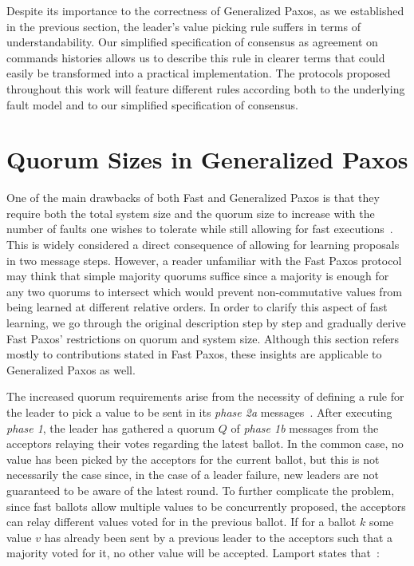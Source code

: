 Despite its importance to the correctness of Generalized Paxos, as we established in the previous section, the leader's value picking rule suffers in terms of understandability. Our simplified specification of consensus as agreement on commands histories allows us to describe this rule in clearer terms that could easily be transformed into a practical implementation. The protocols proposed throughout this work will feature different rules according both to the underlying fault model and to our simplified specification of consensus.

\section{Quorum Sizes in Generalized Paxos} 
One of the main drawbacks of both Fast and Generalized Paxos is that they require both the total system size and the quorum size to increase with the number of faults one wishes to tolerate while still allowing for fast executions~\cite{Lamport2006,Lamport2005}. This is widely considered a direct consequence of allowing for learning proposals in two message steps. However, a reader unfamiliar with the Fast Paxos protocol may think that simple majority quorums suffice since a majority is enough for any two quorums to intersect which would prevent non-commutative values from being learned at different relative orders. In order to clarify this aspect of fast learning, we go through the original description step by step and gradually derive Fast Paxos' restrictions on quorum and system size. Although this section refers mostly to contributions stated in Fast Paxos, these insights are applicable to Generalized Paxos as well.\par
The increased quorum requirements arise from the necessity of defining a rule for the leader to pick a value to be sent in its \textit{phase 2a} messages~\cite{Lamport2006}. After executing \textit{phase 1}, the leader has gathered a quorum $Q$ of \textit{phase 1b} messages from the acceptors relaying their votes regarding the latest ballot. In the common case, no value has been picked by the acceptors for the current ballot, but this is not necessarily the case since, in the case of a leader failure, new leaders are not guaranteed to be aware of the latest round. To further complicate the problem, since fast ballots allow multiple values to be concurrently proposed, the acceptors can relay different values voted for in the previous ballot. If for a ballot $k$ some value $v$ has already been sent by a previous leader to the acceptors such that a majority voted for it, no other value will be accepted. Lamport states that~\cite{Lamport2006}:\par

